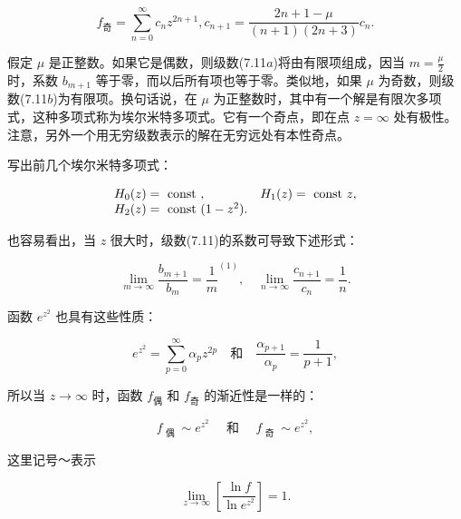 \begin{equation*}
f _ {\text {奇}} = \sum_ {n = 0} ^ {\infty} c _ {n} z ^ {2 n + 1}, c _ {n + 1} = \frac {2 n + 1 - \mu}{(n + 1) (2 n + 3)} c _ {n}.\tag{7.11b}
\end{equation*}

假定 $\mu$ 是正整数。如果它是偶数，则级数(7.11$a$)将由有限项组成，因当 $m = \frac{\mu}{2}$ 时，系数 $b_{m + 1}$ 等于零，而以后所有项也等于零。类似地，如果 $\mu$ 为奇数，则级数(7.11$b$)为有限项。换句话说，在 $\mu$ 为正整数时，其中有一个解是有限次多项式，这种多项式称为埃尔米特多项式。它有一个奇点，即在点 $z = \infty$ 处有极性。注意，另外一个用无穷级数表示的解在无穷远处有本性奇点。

写出前几个埃尔米特多项式：

\begin{equation*}
\begin{array}{l l} H _ {0} (z) = \text { const }, & H _ {1} (z) = \text { const } z, \\ H _ {2} (z) = \text { const } (1 - z ^ {2}). \end{array}
\end{equation*}

也容易看出，当 $z$ 很大时，级数(7.11)的系数可导致下述形式：

\begin{equation*}
\lim _ {m \to \infty} \frac {b _ {m + 1}}{b _ {m}} = \frac {1}{m} ^ {(1)}, \quad \lim _ {n \to \infty} \frac {c _ {n + 1}}{c _ {n}} = \frac {1}{n}.
\end{equation*}

函数 $e^{z^2}$ 也具有这些性质：

\begin{equation*}
e ^ {z ^ {2}} = \sum_ {p = 0} ^ {\infty} \alpha_ {p} z ^ {2 p} \quad \text {和} \quad \frac {\alpha_ {p + 1}}{\alpha_ {p}} = \frac {1}{p + 1},
\end{equation*}

所以当 $z \to \infty$ 时，函数 $f_{\text{偶}}$ 和 $f_{\text{奇}}$ 的渐近性是一样的：

\begin{equation*}
f _ {\text { 偶 }} \sim e ^ {z ^ {2}} \quad \text { 和 } \quad f _ {\text { 奇 }} \sim e ^ {z ^ {2}},
\end{equation*}

这里记号～表示

\begin{equation*}
\lim _ {z \rightarrow \infty} \left[ \frac {\ln f}{\ln e ^ {z ^ {2}}} \right] = 1.
\end{equation*}

